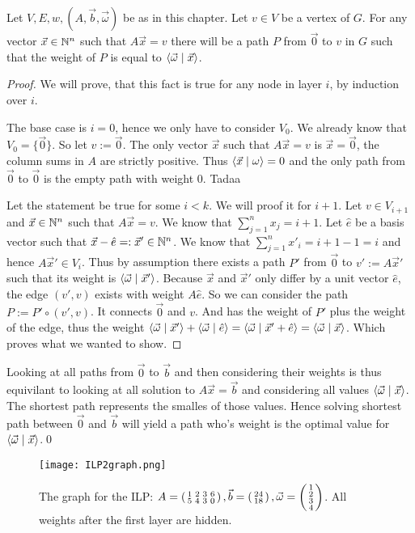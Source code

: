 \begin{lemma}
    Let $V, E, w, (A, \vec b, \vec \omega)$ be as in this chapter. Let $v \in V$ be a vertex of $G$. For any vector $\vec x \in \mathbb{N}^n$ such that $A\vec x = v$ there will be a path $P$ from $\vec 0$ to $v$ in $G$ such that the weight of $P$ is equal to $\langle \vec\omega \mid \vec x \rangle$. 
\end{lemma}
\begin{proof}
    We will prove, that this fact is true for any node in layer $i$, by induction over $i$. 
    
    The base case is $i=0$, hence we only have to consider $V_0$. We already know that $V_0 = \{\vec0\}$. So let $v := \vec 0$. The only vector $\vec x$ such that $A\vec x = v$ is $\vec x = \vec 0$, the column sums in $A$ are strictly positive. Thus $\langle \vec x \mid \omega \rangle = 0$ and the only path from $\vec 0$ to $\vec 0$ is the empty path with weight 0. Tadaa
    
    Let the statement be true for some $i < k$. We will proof it for $i+1$. Let $v \in V_{i+1}$ and $\vec x \in \mathbb{N}^n$ such that $A\vec x = v$. We know that $\sum_{j=1}^n x_j = i+1$. Let $\hat e$ be a basis vector such that $\vec x - \hat e =: \vec x' \in \mathbb{N}^n$. We know that $\sum_{j=1}^{n} x'_i = i+1-1=i$ and hence $A\vec x' \in V_i$. Thus by assumption there exists a path $P'$ from $\vec 0$ to $v' := A\vec x'$ such that its weight is $\langle \vec \omega \mid \vec x' \rangle$. Because $\vec x$ and $\vec x'$ only differ by a unit vector $\hat e$, the edge $(v', v)$ exists with weight $A\hat e$. So we can consider the path $P := P' \circ (v', v)$. It connects $\vec 0$ and $v$. And has the weight of $P'$ plus the weight of the edge, thus the weight $\langle \vec \omega \mid \vec x' \rangle + \langle \vec\omega \mid \hat e \rangle = \langle \vec \omega \mid \vec x' + \hat e \rangle = \langle \vec \omega \mid \vec x \rangle$. Which proves what we wanted to show.
\end{proof}

Looking at all paths from $\vec 0$ to $\vec b$ and then considering their weights is thus equivilant to looking at all solution to $A\vec x = \vec b$ and considering all values $\langle \vec\omega \mid \vec x \rangle$. The shortest path represents the smalles of those values. Hence solving shortest path between $\vec 0$ and $\vec b$ will yield a path who's weight is the optimal value for $\langle \vec\omega \mid \vec x \rangle$.\qed
\begin{figure}
    \texttt{[image: ILP2graph.png]}
    \caption{\label{fig:ILP2graph_no_optimisation}The graph for the ILP: $A = \left(\begin{smallmatrix}1&2&3&6\\5&4&3&0\end{smallmatrix}\right), \vec b = \left(\begin{smallmatrix}24\\18\end{smallmatrix}\right), \vec \omega = \left(\begin{smallmatrix}1\\2\\3\\4\end{smallmatrix}\right)$. All weights after the first layer are hidden.}
\end{figure}

